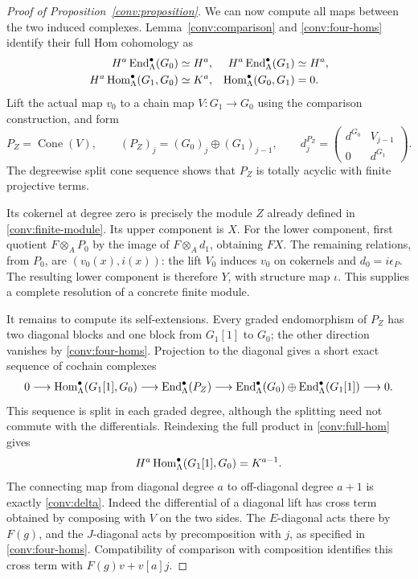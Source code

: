 \begin{proof}[Proof of Proposition~\ref{conv:proposition}]
We can now compute all maps between the two induced complexes.
Lemma~\ref{conv:comparison} and \eqref{conv:four-homs} identify their
full Hom cohomology as
\begin{equation}\label{conv:column-cohomology}
\begin{aligned}
 H^a\operatorname{End}^\bullet_\Lambda(G_0)&\simeq H^a,
 &H^a\operatorname{End}^\bullet_\Lambda(G_1)&\simeq H^a,\\
 H^a\operatorname{Hom}^\bullet_\Lambda(G_1,G_0)&\simeq K^a,
 &\operatorname{Hom}^\bullet_\Lambda(G_0,G_1)&=0.
\end{aligned}
\end{equation}
Lift the actual map $v_0$ to a chain map $V:G_1\to G_0$ using the
comparison construction, and form
\[
 P_Z=\operatorname{Cone}(V),\qquad
 (P_Z)_j=(G_0)_j\oplus(G_1)_{j-1},\qquad
 d_j^{P_Z}=\begin{pmatrix}d^{G_0}&V_{j-1}\\0&d^{G_1}\end{pmatrix}.
\]
The degreewise split cone sequence shows that $P_Z$ is totally acyclic
with finite projective terms.

Its cokernel at degree zero is precisely the module $Z$ already
defined in \eqref{conv:finite-module}.  Its upper component is $X$.
For the lower component, first quotient $F\otimes_A P_0$ by the
image of $F\otimes_A d_1$, obtaining $FX$.  The remaining relations,
from $P_0$, are $(v_0(x),i(x))$: the lift $V_0$ induces $v_0$ on
cokernels and $d_0=i\epsilon_P$.  The resulting lower component is
therefore $Y$, with structure map $\iota$.  This supplies a complete
resolution of a concrete finite module.

It remains to compute its self-extensions.  Every graded endomorphism
of $P_Z$ has two diagonal blocks and one block from $G_1[1]$ to $G_0$;
the other direction vanishes by \eqref{conv:four-homs}.  Projection
to the diagonal gives a short exact sequence of cochain complexes
\begin{equation}\label{conv:end-sequence}
\begin{split}
0\longrightarrow\operatorname{Hom}^\bullet_\Lambda(G_1[1],G_0)
 \longrightarrow\operatorname{End}^\bullet_\Lambda(P_Z)
 \longrightarrow
 \operatorname{End}^\bullet_\Lambda(G_0)\oplus
 \operatorname{End}^\bullet_\Lambda(G_1[1])\longrightarrow0.
\end{split}
\end{equation}
This sequence is split in each graded degree, although the splitting
need not commute with the differentials.  Reindexing the full product
in \eqref{conv:full-hom} gives
\[
 H^a\operatorname{Hom}^\bullet_\Lambda(G_1[1],G_0)=K^{a-1}.
\]
The connecting map from diagonal degree $a$ to off-diagonal degree
$a+1$ is exactly \eqref{conv:delta}.  Indeed the differential of a
diagonal lift has cross term obtained by composing with $V$ on the
two sides.  The $E$-diagonal acts there by $F(g)$, and the $J$-diagonal
acts by precomposition with $j$, as specified in
\eqref{conv:four-homs}.  Compatibility of comparison with composition
identifies this cross term with $F(g)v+v[a]j$.


\end{proof}
